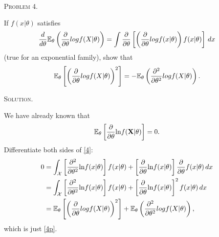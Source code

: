 \documentclass{article}
\begin{document}
\begin{CJK}{UTF8}{gbsn}
    \begin{shaded}
        \noindent\textsc{Problem 4.}\par
        If $f(x|\theta)$ satisfies
        \begin{align}
            \frac{d}{d\theta}{\mathbb E}_{\theta} \left (\frac{\partial }{\partial \theta} log f(X|\theta) \right ) = \int \frac{\partial }{\partial \theta} \left [\left (\frac{\partial }{\partial \theta} log f(x|\theta) \right ) f(x|\theta) \right ]\, dx
        \end{align}
        (true for an exponential family), show that
        \begin{align}
            {\mathbb E}_{\theta} \left [\left ( \frac{\partial }{\partial \theta} log f(X|\theta) \right )^2  \right ] = - {\mathbb E}_{\theta} \left (\frac{\partial^2 }{\partial \theta^2} log f(X|\theta) \right ).\label{4p}
        \end{align}
    \end{shaded}
    \noindent\textsc{Solution.}\par
    We have already known that
    \begin{align}
        {\mathbb E}_{\theta} \left [\frac{\partial}{\partial \theta} \textnormal{ln} f(\mathbf{X|\theta}) \right ] = 0.\label{4}
    \end{align}
    Differentiate both sides of \eqref{4}:
    \begin{align}
        0 & = \int_{\mathcal{X}} \left [\frac{\partial^2}{\partial \theta^2} \textnormal{ln} f(x|\theta) \right ] f(x|\theta) + \left [ \frac{\partial}{\partial \theta}\textnormal{ln} f(x|\theta)\right ]\frac{\partial}{\partial \theta} f(x|\theta)\, dx \notag \\
          & = \int_{\mathcal{X}} \left [\frac{\partial^2}{\partial \theta^2} \textnormal{ln} f(x|\theta) \right ] f(x|\theta) + \left [ \frac{\partial}{\partial \theta}\textnormal{ln} f(x|\theta)\right ]^2 f(x|\theta) \, dx \notag                              \\
          & = {\mathbb E}_{\theta} \left [\left ( \frac{\partial }{\partial \theta} log f(X|\theta) \right )^2  \right ] + {\mathbb E}_{\theta} \left (\frac{\partial^2 }{\partial \theta^2} log f(X|\theta) \right ),\notag
    \end{align}
    which is just \eqref{4p}.


\end{CJK}
\end{document}

